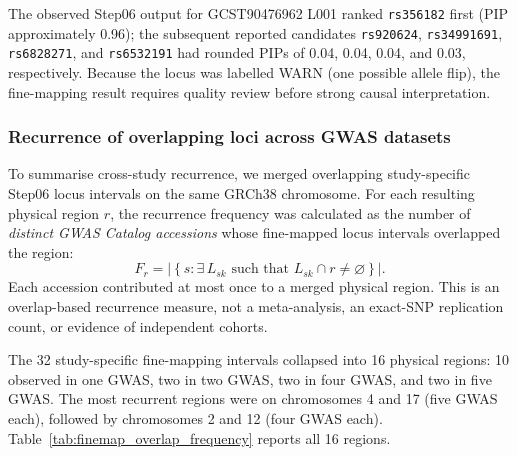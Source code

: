 \documentclass[11pt,a4paper]{article}
\begin{document}
The observed Step06 output for GCST90476962 L001 ranked \texttt{rs356182}
first (PIP approximately 0.96); the subsequent reported candidates
\texttt{rs920624}, \texttt{rs34991691}, \texttt{rs6828271}, and
\texttt{rs6532191} had rounded PIPs of 0.04, 0.04, 0.04, and 0.03,
respectively. Because the locus was labelled WARN (one possible
allele flip), the fine-mapping result requires quality review before
strong causal interpretation.

\subsubsection{Recurrence of overlapping loci across GWAS datasets}
\label{subsec:finemap_recurrent_regions}

To summarise cross-study recurrence, we merged overlapping
study-specific Step06 locus intervals on the same GRCh38 chromosome.
For each resulting physical region $r$, the recurrence frequency was
calculated as the number of \emph{distinct GWAS Catalog accessions}
whose fine-mapped locus intervals overlapped the region:
\begin{equation}
F_r=\left|\left\{s:\exists\,L_{sk}\text{ such that }
L_{sk}\cap r\ne\varnothing\right\}\right|.
\end{equation}
Each accession contributed at most once to a merged physical region.
This is an overlap-based recurrence measure, not a meta-analysis,
an exact-SNP replication count, or evidence of independent cohorts.

The 32 study-specific fine-mapping intervals collapsed into 16
physical regions: 10 observed in one GWAS, two in two GWAS, two in
four GWAS, and two in five GWAS. The most recurrent regions were on
chromosomes 4 and 17 (five GWAS each), followed by chromosomes 2
and 12 (four GWAS each). Table~\ref{tab:finemap_overlap_frequency}
reports all 16 regions.
\end{document}
